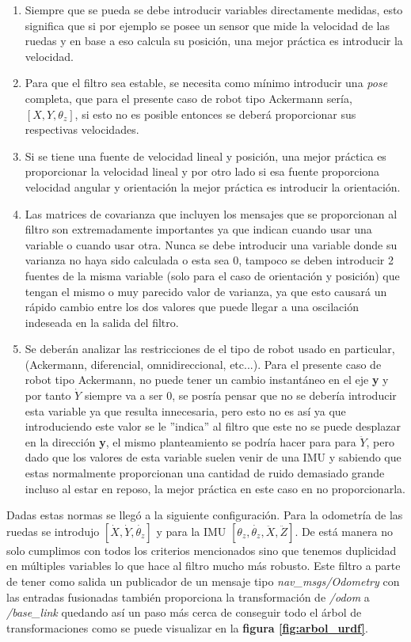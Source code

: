 \begin{enumerate}
    \item Siempre que se pueda se debe introducir variables directamente medidas, esto significa que si por ejemplo se posee un sensor que 
mide la velocidad de las ruedas y en base a eso calcula su posición, una mejor práctica es introducir la velocidad.
    \item Para que el filtro sea estable, se necesita como mínimo introducir una \textit{pose} completa, que para el presente caso de robot tipo Ackermann 
sería, $[ X,Y,\theta_{z}]$, si esto no es posible entonces se deberá proporcionar sus respectivas velocidades.
    \item Si se tiene una fuente de velocidad lineal y posición, una mejor práctica es proporcionar la velocidad lineal y por otro lado si 
esa fuente proporciona velocidad angular y orientación la mejor práctica es introducir la orientación.
    \item Las matrices de covarianza que incluyen los mensajes que se proporcionan al filtro son extremadamente importantes ya que indican 
cuando usar una variable o cuando usar otra. Nunca se debe introducir una variable donde su varianza no haya sido calculada o esta sea 0, 
tampoco se deben introducir 2 fuentes de la misma variable (solo para el caso de orientación y posición) que tengan el mismo o muy parecido 
valor de varianza, ya que esto causará un rápido cambio entre los dos valores que puede llegar a una oscilación indeseada en la salida del 
filtro.
    \item Se deberán analizar las restricciones de el tipo de robot usado en particular, (Ackermann, diferencial, omnidireccional, etc...). 
Para el presente caso de robot tipo Ackermann, no puede tener un cambio instantáneo en el eje \textbf{y} y por tanto $\dot{Y}$ siempre va 
a ser 0, se posría pensar que no se debería introducir esta variable ya que resulta innecesaria, pero esto no es así ya que introduciendo este valor se le 
''indica'' al filtro que este no se puede desplazar en la dirección \textbf{y}, el mismo planteamiento se podría hacer para para $\ddot{Y}$, pero dado que los 
valores de esta variable suelen venir de una IMU y sabiendo que estas normalmente proporcionan una cantidad de ruido demasiado grande incluso al estar en reposo,  la 
mejor práctica en este caso en no proporcionarla.
\end{enumerate}

Dadas estas normas se llegó a la siguiente configuración. Para la odometría de las ruedas se introdujo 
$[ \dot{X},\dot{Y},\dot{\theta_{z}} ]$ y para la IMU $[ \theta_{z},\dot{\theta_{z}},\ddot{X},\ddot{Z} ]$. De está manera no solo cumplimos 
con todos los criterios mencionados sino que tenemos duplicidad en múltiples variables lo que hace al filtro mucho más robusto. Este filtro 
a parte de tener como salida un publicador de un mensaje tipo \textit{nav\_msgs/Odometry} con las entradas fusionadas también 
proporciona la transformación de \textit{/odom} a \textit{/base\_link} quedando así un paso más cerca de conseguir todo el árbol de 
transformaciones como se puede visualizar en la \textbf{figura \ref{fig:arbol_urdf}}.

